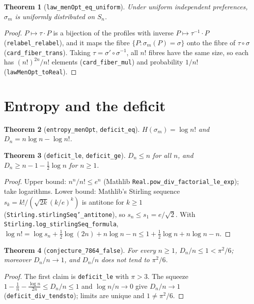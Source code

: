 \documentclass[11pt]{article}
\newtheorem{theorem}{Theorem}
\theoremstyle{definition}
\begin{document}
\begin{theorem}[\texttt{law\_menOpt\_eq\_uniform}]
Under uniform independent preferences, $\sigma_m$ is uniformly distributed on $S_n$.
\end{theorem}

\begin{proof}
$P\mapsto\tau\cdot P$ is a bijection of the profiles with inverse $P\mapsto\tau^{-1}\cdot P$
(\texttt{relabel\_relabel}), and it maps the fibre $\{P:\sigma_m(P)=\sigma\}$ onto the fibre of $\tau\circ\sigma$
(\texttt{card\_fiber\_trans}). Taking $\tau=\sigma'\circ\sigma^{-1}$, all $n!$ fibres have the same size, so each has
$(n!)^{2n}/n!$ elements (\texttt{card\_fiber\_mul}) and probability $1/n!$ (\texttt{lawMenOpt\_toReal}).
\end{proof}

\section{Entropy and the deficit}

\begin{theorem}[\texttt{entropy\_menOpt}, \texttt{deficit\_eq}]
$H(\sigma_m)=\log n!$ and $D_n=n\log n-\log n!$.
\end{theorem}

\begin{theorem}[\texttt{deficit\_le}, \texttt{deficit\_ge}]
$D_n\le n$ for all $n$, and $D_n\ge n-1-\tfrac12\log n$ for $n\ge 1$.
\end{theorem}

\begin{proof}
Upper bound: $n^n/n!\le e^n$ (Mathlib \texttt{Real.pow\_div\_factorial\_le\_exp}); take logarithms. Lower bound:
Mathlib's Stirling sequence $s_k=k!/(\sqrt{2k}(k/e)^k)$ is antitone for $k\ge1$ (\texttt{Stirling.stirlingSeq'\_antitone}),
so $s_n\le s_1=e/\sqrt2$. With \texttt{Stirling.log\_stirlingSeq\_formula},
$\log n! = \log s_n+\tfrac12\log(2n)+n\log n-n\le 1+\tfrac12\log n+n\log n-n$.
\end{proof}

\begin{theorem}[\texttt{conjecture\_7864\_false}]
For every $n\ge1$, $D_n/n\le 1<\pi^2/6$; moreover $D_n/n\to1$, and $D_n/n$ does not tend to $\pi^2/6$.
\end{theorem}

\begin{proof}
The first claim is \texttt{deficit\_le} with $\pi>3$. The squeeze $1-\frac1n-\frac{\log n}{2n}\le D_n/n\le1$ and
$\log n/n\to0$ give $D_n/n\to1$ (\texttt{deficit\_div\_tendsto}); limits are unique and $1\ne\pi^2/6$.
\end{proof}
\end{document}
